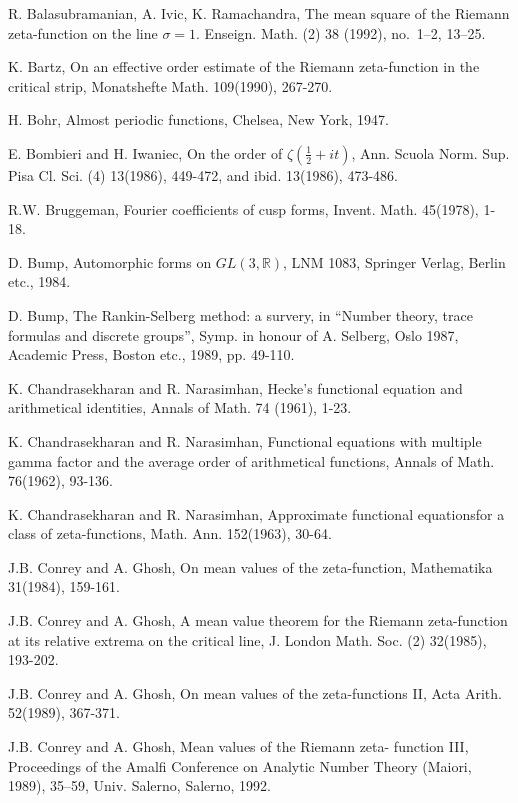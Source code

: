 \begin{thebibliography}{99}
 R. Balasubramanian, A. Ivic, K. Ramachandra, The mean square of the Riemann zeta-function on the line $\sigma=1$. Enseign. Math. (2) 38 (1992), no.~1--2, 13--25.

 K. Bartz, On an effective order estimate of the Riemann zeta-function in the critical strip, Monatshefte Math. 109(1990), 267-270.

 H. Bohr, Almost periodic functions, Chelsea, New York, 1947.

 E. Bombieri and H. Iwaniec, On the order of $\zeta(\frac{1}{2} + it)$, Ann. Scuola Norm. Sup. Pisa Cl. Sci. (4) 13(1986), 449-472, and ibid. 13(1986), 473-486.

 R.W. Bruggeman, Fourier coefficients of cusp forms, Invent. Math. 45(1978), 1-18.

 D. Bump, Automorphic forms on $GL(3,\mathbb{R})$, LNM 1083, Springer Verlag, Berlin etc., 1984.

 D. Bump, The Rankin-Selberg method: a survery, in ``Number theory, trace formulas and discrete groups'', Symp. in honour of A. Selberg, Oslo 1987, Academic Press, Boston etc., 1989, pp. 49-110.

 K. Chandrasekharan and R. Narasimhan, Hecke's functional equation and arithmetical identities, Annals of Math. 74 (1961), 1-23.

 K. Chandrasekharan and R. Narasimhan, Functional equations with multiple gamma factor and the average order of arithmetical functions, Annals of Math. 76(1962), 93-136.

 K. Chandrasekharan and R. Narasimhan, Approximate functional equations\pageoriginale for a class of zeta-functions, Math. Ann. 152(1963), 30-64.

 J.B. Conrey and A. Ghosh, On mean values of the zeta-function, Mathematika  31(1984), 159-161.

 J.B. Conrey and A. Ghosh, A mean value theorem for the Riemann zeta-function at its relative extrema on the critical line, J. London Math. Soc. (2) 32(1985), 193-202.

 J.B. Conrey and A. Ghosh, On mean values of the zeta-functions II, Acta Arith. 52(1989), 367-371.

 J.B. Conrey and A. Ghosh, Mean values of the Riemann zeta- function III, Proceedings of the Amalfi Conference on Analytic Number Theory (Maiori, 1989), 35--59, Univ. Salerno, Salerno, 1992.


\end{thebibliography}
